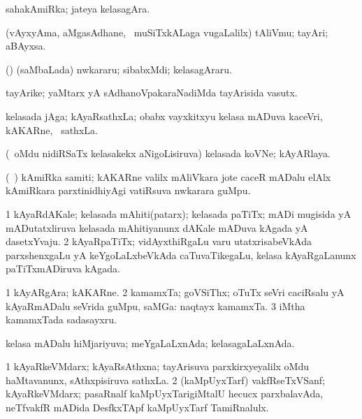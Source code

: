 \begin{center}
\bentry
{} 
\gl{\nA}
\expl{}
\bmng
sahakAmiRka; jateya kelasagAra. 
\emng
\eentry

\bentry
{} 
\gl{\nA}
\expl{}
\bmng
(vAyxyAma, aMgasAdhane, \kanmu\ muSiTxkALaga \mo vugaLalilx) tAliVmu; tayAri; aBAyxsa. 
\emng
\eentry

\bentry
{} 
\gl{\nA}
\expl{}
\bmng
(\bava) (saMbaLada) nwkararu; sibabxMdi; kelasagAraru. 
\emng
\eentry

\bentry
{} 
\gl{\nA}
\expl{}
\bmng
tayArike; yaMtarx yA sAdhanoVpakaraNadiMda tayArisida vasutx. 
\emng
\eentry

\bentry 
{} 
\gl{\nA}
\expl{}
\bmng
kelasada jAga; kAyaRsathxLa; obabx vayxkitxyu kelasa mADuva kaceVri, kAKARne, \mo\ sathxLa. 
\emng
\eentry

\bentry
{} 
\gl{\nA}
\expl{}
\bmng
(\kanmu\ oMdu nidiRSaTx kelasakekx aNigoLisiruva) kelasada koVNe; kAyARlaya. 
\emng
\eentry

\bentry
{} 
\gl{\nA}
\expl{}
\bmng
(\kanmu\ \birx) kAmiRka samiti; kAKARne \mo valilx mAliVkara jote caceR mADalu elAlx kAmiRkara parxtinidhiyAgi vatiRsuva nwkarara guMpu. 
\emng
\eentry

\bentry
{} 
\gl{\nA}
\expl{}
\bmng
\bnum
\num{1} kAyaRdAKale; kelasada mAhiti(patarx); kelasada paTiTx; mADi mugisida yA mADutatxliruva kelasada mAhitiyanunx dAKale mADuva kAgada yA dasetxYvaju. 
\num{2} kAyaRpaTiTx; vidAyxthiRgaLu \mo varu utatxrisabeVkAda parxshenxgaLu yA keYgoLaLxbeVkAda caTuvaTikegaLu, kelasa kAyaRgaLanunx paTiTxmADiruva kAgada. 
\enum
\emng
\eentry

\bentry
{} 
\gl{\nA}
\expl{}
\bmng
\bnum
\num{1} kAyARgAra; kAKARne. 
\num{2} kamamxTa; goVSiThx; oTuTx seVri caciRsalu yA kAyaRmADalu seVrida guMpu, saMGa:  naqtayx kamamxTa. 
\num{3} iMtha kamamxTada sadasayxru. 
\enum
\emng
\eentry

\bentry
{} 
\gl{\gu}
\expl{}
\bmng
kelasa mADalu hiMjariyuva; meYgaLaLxnAda; kelasagaLaLxnAda. 
\emng
\eentry

\bentry
{} 
\gl{\nA}
\expl{}
\bmng
\bnum
\num{1} kAyaRkeVMdarx; kAyaRsAthxna; tayArisuva parxkirxyeyalilx oMdu haMtavanunx, sAthxpisiruva sathxLa. 
\num{2} (kaMpUyxTarf) vakfRseTxVSanf; kAyaRkeVMdarx; pasaRnalf kaMpUyxTarigiMtalU hecucx parxbalavAda, neTfvakfR mADida DesfkxTApf kaMpUyxTarf TamiRnalulx. 
\enum
\emng
\eentry


\end{center}
